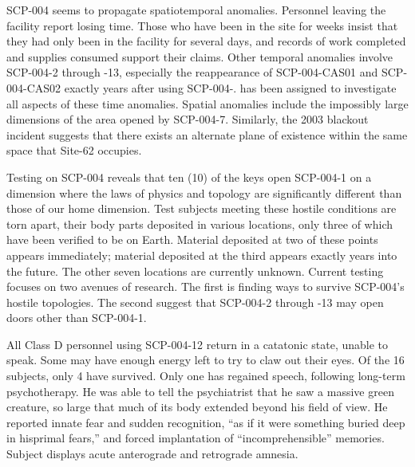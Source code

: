 \begin{flushleft}
\end{flushleft}

SCP-004 seems to propagate spatiotemporal anomalies. Personnel leaving the facility report losing time. Those who have been in the site for weeks insist that they had only been in the facility for several days, and records of work completed and supplies consumed support their claims. Other temporal anomalies involve SCP-004-2 through -13, especially the reappearance of SCP-004-CAS01 and SCP-004-CAS02 exactly  years after using SCP-004-.  has been assigned to investigate all aspects of these time anomalies. Spatial anomalies include the impossibly large dimensions of the area opened by SCP-004-7. Similarly, the 2003 blackout incident suggests that there exists an alternate plane of existence within the same space that Site-62 occupies.

\begin{flushleft}
\end{flushleft}

Testing on SCP-004 reveals that ten (10) of the keys open SCP-004-1 on a dimension where the laws of physics and topology are significantly different than those of our home dimension. Test subjects meeting these hostile conditions are torn apart, their body parts deposited in various locations, only three of which have been verified to be on Earth. Material deposited at two of these points appears immediately; material deposited at the third appears exactly  years into the future. The other seven locations are currently unknown.
\newpage
Current testing focuses on two avenues of research. The first is finding ways to survive SCP-004’s hostile topologies. The second \expunged suggest that SCP-004-2 through -13 may open doors other than SCP-004-1.

\begin{flushleft}
\end{flushleft}

All Class D personnel using SCP-004-12 return in a catatonic state, unable to speak. Some may have enough energy left to try to claw out their eyes. Of the 16 subjects, only 4 have survived. Only one has regained speech, following long-term psychotherapy. He was able to tell the psychiatrist that he saw a massive green creature, so large that much of its body extended beyond his field of view. He reported innate fear and sudden recognition, “as if it were something buried deep in \lb his\rb primal fears,” and forced implantation of “incomprehensible” memories. Subject displays acute anterograde and retrograde amnesia.

